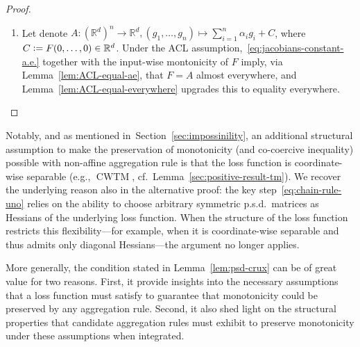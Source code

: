 \documentclass[twoside,11pt]{article}
\newcommand{\R}{\mathbb{R}}
\begin{document}
\begin{proof}
\begin{enumerate}
        \item[\textit{(iii)}]
        Let denote $A: (\R^d)^n \to \R^d, (g_1, \ldots, g_n) \mapsto \sum_{i=1}^n \alpha_i g_i + C$, where $C \vcentcolon= F(0, \ldots, 0) \in\R^d$.
        Under the ACL assumption,~\eqref{eq:jacobians-constant-a.e.} together with the input-wise montonicity of $F$ imply, via Lemma~\ref{lem:ACL-equal-ae}, that $F=A$ almost everywhere, and Lemma~\ref{lem:ACL-equal-everywhere} upgrades this to equality everywhere.
    \end{enumerate}
\end{proof}

Notably, and as mentioned in~Section~\ref{sec:impossinility}, an additional structural assumption to make the preservation of monotonicity (and co-coercive inequality) possible with non-affine aggregation rule is that the loss function is coordinate-wise separable 
(e.g., $\operatorname{CWTM}$, cf.\ Lemma~\ref{sec:positive-result-tm}).
We recover the underlying reason also in the alternative proof: the key step~\eqref{eq:chain-rule-uno} relies on the ability to choose arbitrary symmetric p.s.d.\ matrices as Hessians of the underlying loss function. 
When the structure of the loss function restricts this flexibility---for example, when it is coordinate-wise separable and thus admits only diagonal Hessians---the argument no longer applies.

More generally, the condition stated in Lemma~\ref{lem:psd-crux} can be of great value for two reasons. 
First, it provide insights into the necessary assumptions that a loss function must satisfy to guarantee that monotonicity could be preserved by any aggregation rule.
Second, it also shed light on the structural properties that candidate aggregation rules must exhibit to preserve monotonicity under these assumptions when integrated.        
\end{document}
